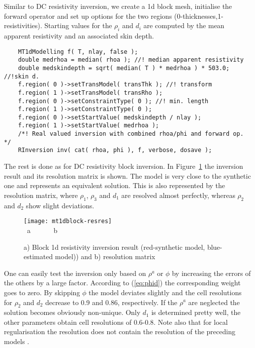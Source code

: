 Similar to DC resistivity inversion, we create a 1d block mesh, initialise the forward operator and set up options for the two regions (0-thicknesses,1-resistivities).
Starting values for the $\rho_i$ and $d_i$ are computed by the mean apparent resistivity and an associated skin depth.
\begin{lstlisting}
    MT1dModelling f( T, nlay, false );
    double medrhoa = median( rhoa ); //! median apparent resistivity
    double medskindepth = sqrt( median( T ) * medrhoa ) * 503.0; //!skin d.
    f.region( 0 )->setTransModel( transThk ); //! transform
    f.region( 1 )->setTransModel( transRho );
    f.region( 0 )->setConstraintType( 0 ); //! min. length
    f.region( 1 )->setConstraintType( 0 );
    f.region( 0 )->setStartValue( medskindepth / nlay );
    f.region( 1 )->setStartValue( medrhoa );
    /*! Real valued inversion with combined rhoa/phi and forward op. */
    RInversion inv( cat( rhoa, phi ), f, verbose, dosave );
\end{lstlisting}

The rest is done as for DC resistivity block inversion.
In Figure~\ref{fig:mt1dblock-resres} the inversion result and its resolution matrix is shown.
The model is very close to the synthetic one and represents an equivalent solution.
This is also represented by the resolution matrix, where $\rho_1$, $\rho_3$ and $d_1$ are resolved almost perfectly, whereas $\rho_2$ and $d_2$ show slight deviations.
\begin{figure}[htbp]
\centering\texttt{[image: mt1dblock-resres]}\\[-3ex]
~\hfill a\hfill ~ \hfill ~~~~~b \hfill ~ \hfill ~ \hfill ~
\caption{a) Block 1d resistivity inversion result (red-synthetic model, blue-estimated model)) and b) resolution matrix}\label{fig:mt1dblock-resres}
\end{figure}

One can easily test the inversion only based on $\rho^a$ or $\phi$ by increasing the errors of the others by a large factor.
According to (\ref{eq:phid}) the corresponding weight goes to zero.
By skipping $\phi$ the model deviates slightly and the cell resolutions for $\rho_2$ and $d_2$ decrease to 0.9 and 0.86, respectively. If the $\rho^a$ are neglected the solution becomes obviously non-unique. Only $d_1$ is determined pretty well, the other parameters obtain cell resolutions of 0.6-0.8. Note also that for local regularisation the resolution does not contain the resolution of the preceding models \citep{friedel03}.

